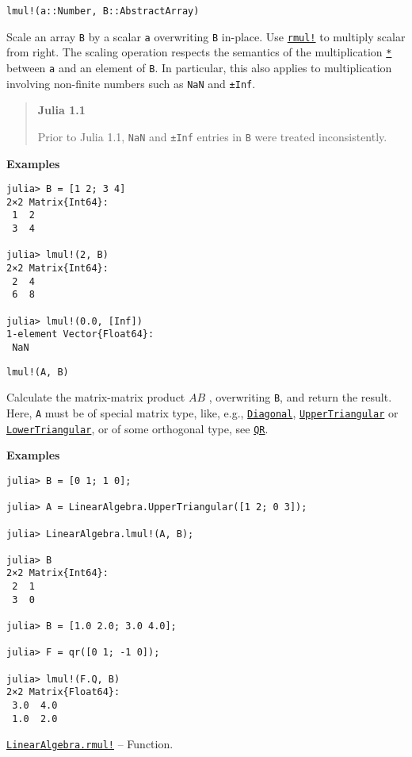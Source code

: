 \begin{adjustwidth}{2em}{0pt}


\begin{verbatim}
lmul!(a::Number, B::AbstractArray)
\end{verbatim}

Scale an array \texttt{B} by a scalar \texttt{a} overwriting \texttt{B} in-place.  Use \hyperlink{11562785155463579477}{\texttt{rmul!}} to multiply scalar from right.  The scaling operation respects the semantics of the multiplication \hyperlink{5498506958944335098}{\texttt{*}} between \texttt{a} and an element of \texttt{B}.  In particular, this also applies to multiplication involving non-finite numbers such as \texttt{NaN} and \texttt{±Inf}.

\begin{quote}
\textbf{Julia 1.1}

Prior to Julia 1.1, \texttt{NaN} and \texttt{±Inf} entries in \texttt{B} were treated inconsistently.

\end{quote}
\textbf{Examples}


\begin{verbatim}
julia> B = [1 2; 3 4]
2×2 Matrix{Int64}:
 1  2
 3  4

julia> lmul!(2, B)
2×2 Matrix{Int64}:
 2  4
 6  8

julia> lmul!(0.0, [Inf])
1-element Vector{Float64}:
 NaN
\end{verbatim}




\begin{lstlisting}
lmul!(A, B)
\end{lstlisting}

Calculate the matrix-matrix product  \(AB\) , overwriting \texttt{B}, and return the result. Here, \texttt{A} must be of special matrix type, like, e.g., \hyperlink{3300114559258360989}{\texttt{Diagonal}}, \hyperlink{6344726545165008167}{\texttt{UpperTriangular}} or \hyperlink{15116078732779234709}{\texttt{LowerTriangular}}, or of some orthogonal type, see \hyperlink{16913872014958777367}{\texttt{QR}}.

\textbf{Examples}


\begin{verbatim}
julia> B = [0 1; 1 0];

julia> A = LinearAlgebra.UpperTriangular([1 2; 0 3]);

julia> LinearAlgebra.lmul!(A, B);

julia> B
2×2 Matrix{Int64}:
 2  1
 3  0

julia> B = [1.0 2.0; 3.0 4.0];

julia> F = qr([0 1; -1 0]);

julia> lmul!(F.Q, B)
2×2 Matrix{Float64}:
 3.0  4.0
 1.0  2.0
\end{verbatim}



\end{adjustwidth}
\hypertarget{11562785155463579477}{}
\hyperlink{11562785155463579477}{\texttt{LinearAlgebra.rmul!}}  -- {Function.}

